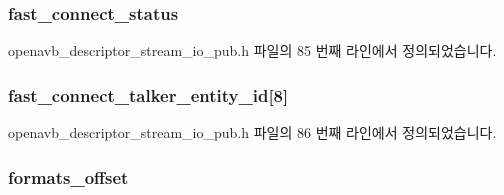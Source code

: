 \subsubsection[{\texorpdfstring{fast\+\_\+connect\+\_\+status}{fast_connect_status}}]{ fast\+\_\+connect\+\_\+status}\hypertarget{structopenavb__aem__descriptor__stream__io__t_a27979bafb0c8d81df88d4310ca08b94b}{}\label{structopenavb__aem__descriptor__stream__io__t_a27979bafb0c8d81df88d4310ca08b94b}


openavb\+\_\+descriptor\+\_\+stream\+\_\+io\+\_\+pub.\+h 파일의 85 번째 라인에서 정의되었습니다.

\subsubsection[{\texorpdfstring{fast\+\_\+connect\+\_\+talker\+\_\+entity\+\_\+id}{fast_connect_talker_entity_id}}]{ fast\+\_\+connect\+\_\+talker\+\_\+entity\+\_\+id\mbox{[}8\mbox{]}}\hypertarget{structopenavb__aem__descriptor__stream__io__t_ab0faa2b4ba9b5db39237037c43093be0}{}\label{structopenavb__aem__descriptor__stream__io__t_ab0faa2b4ba9b5db39237037c43093be0}


openavb\+\_\+descriptor\+\_\+stream\+\_\+io\+\_\+pub.\+h 파일의 86 번째 라인에서 정의되었습니다.

\subsubsection[{\texorpdfstring{formats\+\_\+offset}{formats_offset}}]{ formats\+\_\+offset}\hypertarget{structopenavb__aem__descriptor__stream__io__t_a06a148b7ab7a91cb72bc613a0b583f04}{}\label{structopenavb__aem__descriptor__stream__io__t_a06a148b7ab7a91cb72bc613a0b583f04}


